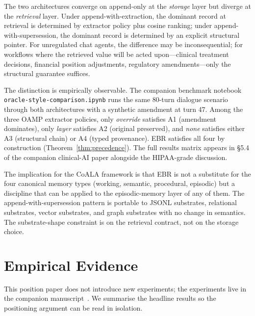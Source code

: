 \documentclass[11pt,a4paper]{article}
\begin{document}
The two architectures converge on append-only at the \emph{storage}
layer but diverge at the \emph{retrieval} layer. Under
append-with-extraction, the dominant record at retrieval is determined
by extractor policy plus cosine ranking; under append-with-supersession,
the dominant record is determined by an explicit structural pointer.
For unregulated chat agents, the difference may be inconsequential; for
workflows where the retrieved value will be acted upon---clinical
treatment decisions, financial position adjustments, regulatory
amendments---only the structural guarantee suffices.

The distinction is empirically observable. The companion benchmark
notebook \texttt{oracle-style-comparison.ipynb} runs the same 80-turn
dialogue scenario through both architectures with a synthetic amendment
at turn 47. Among the three OAMP extractor policies, only
\emph{override} satisfies A1 (amendment dominates), only \emph{layer}
satisfies A2 (original preserved), and \emph{none} satisfies either A3
(structural chain) or A4 (typed provenance). EBR satisfies all four by
construction (Theorem~\ref{thm:precedence}). The full results matrix
appears in \S5.4 of the companion clinical-AI paper alongside the
HIPAA-grade discussion.

The implication for the CoALA framework is that EBR is not a substitute
for the four canonical memory types (working, semantic, procedural,
episodic) but a discipline that can be applied to the episodic-memory
layer of any of them. The append-with-supersession pattern is portable
to JSONL substrates, relational substrates, vector substrates, and graph
substrates with no change in semantics. The substrate-shape constraint
is on the retrieval contract, not on the storage choice.

\section{Empirical Evidence}
\label{sec:empirical}

\noindent
This position paper does not introduce new experiments; the experiments live in the
companion manuscript~\cite{anthony2026ebr}. We summarise the headline results so the
positioning argument can be read in isolation.
\end{document}

